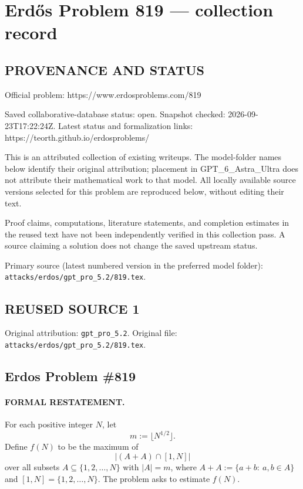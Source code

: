 \section*{Erd\H{o}s Problem 819 --- collection record}

\subsection*{PROVENANCE AND STATUS}
Official problem: https://www.erdosproblems.com/819

Saved collaborative-database status: open.
Snapshot checked: 2026-09-23T17:22:24Z.
Latest status and formalization links: https://teorth.github.io/erdosproblems/

This is an attributed collection of existing writeups. The model-folder names below identify their original attribution; placement in GPT\_6\_Astra\_Ultra does not attribute their mathematical work to that model. All locally available source versions selected for this problem are reproduced below, without editing their text.

Proof claims, computations, literature statements, and completion estimates in the reused text have not been independently verified in this collection pass. A source claiming a solution does not change the saved upstream status.

Primary source (latest numbered version in the preferred model folder): \texttt{attacks/erdos/gpt\_pro\_5.2/819.tex}.

\subsection*{REUSED SOURCE 1}
Original attribution: \texttt{gpt\_pro\_5.2}.
Original file: \texttt{attacks/erdos/gpt\_pro\_5.2/819.tex}.

\subsection*{Erdos Problem \#819}

\paragraph{FORMAL RESTATEMENT.}
For each positive integer $N$, let
\[
m := \lfloor N^{1/2}\rfloor.
\]
Define $f(N)$ to be the maximum of
\[
|(A+A)\cap [1,N]|
\]
over all subsets $A\subseteq\{1,2,\dots,N\}$ with $|A|=m$, where $A+A:=\{a+b:\ a,b\in A\}$ and $[1,N]=\{1,2,\dots,N\}$.
The problem asks to estimate $f(N)$.

